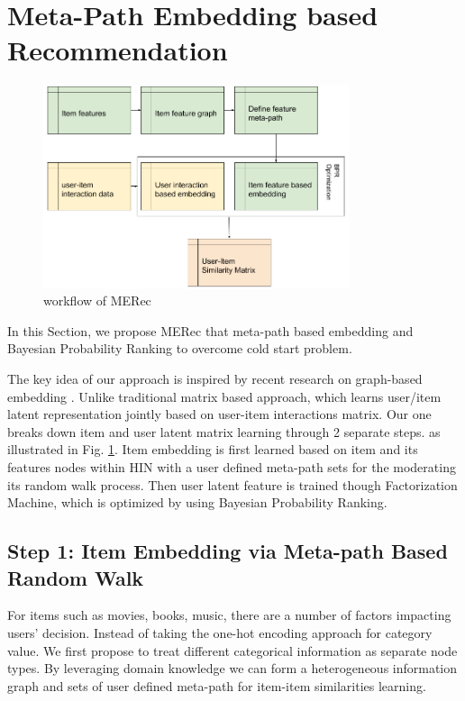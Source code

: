 \section{Meta-Path Embedding based Recommendation}

\begin{figure}[!t]
    \centering
    \includegraphics[width=0.8\textwidth]{figs/fig0.png}
    \caption{workflow of MERec}\label{fig:fe-overview}
\end{figure}

In this Section, we propose MERec that meta-path based embedding and Bayesian Probability Ranking to overcome cold start problem. 

The key idea of our approach is inspired by recent research on graph-based embedding \cite{dong2017metapath2vec}. Unlike traditional matrix based approach, which learns user/item latent representation jointly based on user-item interactions matrix.\cite{rendle2012bpr} Our one breaks down item and user latent matrix learning through 2 separate steps. as illustrated in Fig. \ref{fig:fe-overview}. Item embedding is first learned based on item and its features nodes within HIN with a user defined meta-path sets for the moderating its random walk process. Then user latent feature is trained though Factorization Machine, which is optimized by using Bayesian Probability Ranking.

\subsection{Step 1: Item Embedding via Meta-path Based Random Walk}\label{3MF}

For items such as movies, books, music, there are a number of factors impacting users' decision. Instead of taking the one-hot encoding approach for category value. We first propose to treat different categorical information as separate node types. 
By leveraging domain knowledge we can form a heterogeneous information graph and sets of user defined meta-path for item-item similarities learning. 

